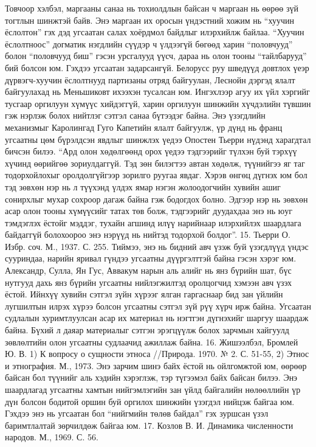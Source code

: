 Товчоор хэлбэл, маргааны санаа нь тохиолдлын байсан ч маргаан нь өөрөө зүй тогтлын шинжтэй байв. Энэ маргаан их оросын үндэстний хожим нь “хуучин ёслолтон” гэх дэд угсаатан салах хоёрдмол байдлыг илэрхийлж байлаа. “Хуучин ёслолтноос” догматик нэгдлийн сүүдэр ч үлдээгүй бөгөөд харин “половчууд” болон “половчууд биш” гэсэн урсгалууд үүсч, дараа нь олон тооны “тайлбарууд” бий болсон юм. Гэхдээ угсаатан задарсангүй. Белорусс руу шведүүд довтлох үеэр дүрвэгч-хуучин ёслолтнууд партизаны отряд байгуулан, Леснойн дэргэд ялалт байгуулахад нь Меньшиковт ихээхэн тусалсан юм.
Ингэхлээр агуу их үйл хэргийг тусгаар оргилуун хүмүүс хийдэггүй, харин оргилуун шинжийн хүчдэлийн түвшин гэж нэрлэж болох нийтлэг сэтгэл санаа бүтээдэг байна. Энэ үзэгдлийн механизмыг Каролингад Гуго Капетийн ялалт байгуулж, үр дүнд нь франц угсаатны цөм бүрэлдсэн явдлыг шинжлэх үедээ Опостен Тьерри нүдэнд харагдтал бичсэн билээ. “Ард олон хөдөлгөөнд орох үедээ тэдгээрийг түлхэн буй тэрхүү хүчинд өөрийгөө зориулдаггүй. Тэд зөн билэгтээ автан хөдөлж, түүнийгээ яг таг тодорхойлохыг оролдолгүйгээр зорилго руугаа явдаг. Хэрэв өнгөц дүгнэх юм бол тэд зөвхөн нэр нь л түүхэнд үлдэх ямар нэгэн жолоодогчийн хувийн ашиг сонирхлыг мухар сохроор дагаж байна гэж бодогдох болно. Эдгээр нэр нь зөвхөн асар олон тооны хүмүүсийг татах төв болж, тэдгээрийг дуудахдаа энэ нь юуг тэмдэглэх ёстойг мэддэг, тухайн агшинд илүү нарийнаар илэрхийлэх шаардлага байдаггүй болохоороо энэ нэрүүд нь нийтэд тодорхой болдог”. 15. Тьерри О. Избр. соч. М., 1937. С. 255.
Тиймээ, энэ нь бидний авч үзэж буй үзэгдлүүд үндэс сууриндаа, нарийн яривал гүндээ угсаатны дүүргэлттэй байна гэсэн хэрэг юм. Александр, Сулла, Ян Гус, Аввакум нарын аль алийг нь янз бүрийн шат, бүс нутгууд дахь янз бүрийн угсаатны нийлэгжилтэд оролцогчид хэмээн авч үзэх ёстой. Ийнхүү хувийн сэтгэл зүйн хүрээг ялган гаргаснаар бид зан үйлийн лугшилтын илрэх хүрээ болсон угсаатны сэтгэл зүй рүү хүрч ирж байна.
Угсаатан судлалын хуримтлуулсан асар их материал нь нэгтгэн дүгнэхийг шаргуу шаардаж байна. Бүхий л даяар материалыг сэтгэн эрэгцүүлж болох зарчмын хайгуулд зөвлөлтийн олон угсаатны судлаачид ажиллаж байна. 16. Жишээлбэл, Бромлей Ю. В. 1) К вопросу о сущности этноса //Природа. 1970. № 2. С. 51-55, 2) Этнос и этнография. М., 1973.
Энэ зарчим шинэ байх ёстой нь ойлгомжтой юм, өөрөөр байсан бол түүнийг аль хэдийн хэрэглэж, тэр түгээмэл байх байсан билээ. Энэ шаардлагад угсаатны хамтын нийгэмлэгийн зан үйлд байгалийн нөлөөллийн үр дүн болсон бодитой оршин буй оргилох шинжийн үзэгдэл нийцэж байгаа юм. Гэхдээ энэ нь угсаатан бол “нийгмийн төлөв байдал” гэх зуршсан үзэл баримтлалтай зөрчилдөж байгаа юм. 17. Козлов В. И. Динамика численности народов. М., 1969. С. 56.
